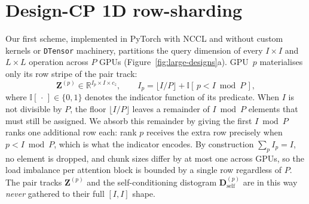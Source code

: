 \section{Design-CP 1D row-sharding}
\label{sec:cp-1d}

Our first scheme, implemented in PyTorch with NCCL and without custom kernels or
\texttt{DTensor} machinery, partitions the query dimension of every $I\times I$
and $L\times L$ operation across $P$ GPUs (Figure~\ref{fig:large-designs}a).
GPU~$p$ materialises only its row stripe of the pair track:
%
\begin{equation}
  \mathbf{Z}^{(p)} \in \mathbb{R}^{I_p \times I \times c_z}, \qquad
  I_p = \lfloor I/P \rfloor + \mathbb{I}[\,p < I \bmod P\,],
  \label{eq:row-stripe}
\end{equation}
%
where $\mathbb{I}[\,\cdot\,]\in\{0,1\}$ denotes the indicator function of its
predicate. When $I$ is not divisible by $P$, the floor $\lfloor I/P\rfloor$ leaves
a remainder of $I \bmod P$ elements that must still be assigned. We absorb this
remainder by giving the first $I \bmod P$ ranks one additional row each: rank $p$
receives the extra row precisely when $p < I \bmod P$, which is what the indicator
encodes. By construction $\sum_{p}I_p = I$, no element is dropped, and chunk sizes
differ by at most one across GPUs, so the load imbalance per attention block is
bounded by a single row regardless of $P$. The pair tracks $\mathbf{Z}^{(p)}$ and
the self-conditioning distogram $\mathbf{D}^{(p)}_\text{self}$ are in this way
\emph{never} gathered to their full $[I,I]$ shape.

